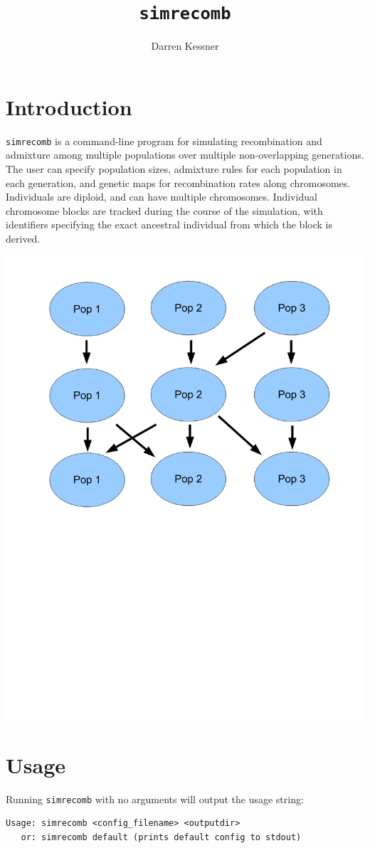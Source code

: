 \documentclass{article}
\begin{document}
\title{\texttt{simrecomb}}
\author{Darren Kessner}
\maketitle



\section*{Introduction}


\texttt{simrecomb} is a command-line program for simulating recombination and
admixture among multiple populations over multiple non-overlapping generations.
The user can specify population sizes, admixture rules for each population in
each generation, and genetic maps for recombination rates along chromosomes.
Individuals are diploid, and can have multiple chromosomes.  Individual
chromosome blocks are tracked during the course of the simulation, with
identifiers specifying the exact ancestral individual from which the block is
derived.

\begin{center}
\includegraphics[width=.50\textwidth]{fig/simrecomb_cartoon.pdf}
\end{center}


\section*{Usage}
Running \texttt{simrecomb} with no arguments will output the usage string:
\begin{verbatim}
Usage: simrecomb <config_filename> <outputdir>
   or: simrecomb default (prints default config to stdout)
\end{verbatim}
\end{document}
